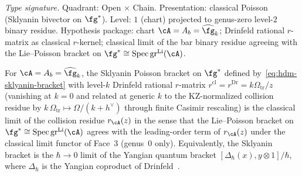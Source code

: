 \begin{theorem}
\label{thm:hdm-face-6}
\emph{Type signature.} Quadrant: Open $\times$ Chain. Presentation:
classical Poisson (Sklyanin bivector on $\fg^*$). Level: $1$ (chart)
projected to genus-zero level-$2$ binary residue.
Hypothesis package: chart $\cA = A_b = \widehat{\fg}_k$; Drinfeld
rational $r$-matrix as classical $r$-kernel; classical limit of
the bar binary residue agreeing with the Lie--Poisson bracket
on $\fg^*\cong\mathrm{Spec}\,\mathrm{gr}^{\mathrm{Li}}(\cA)$.

For $\cA = A_b = \widehat{\fg}_k$, the Sklyanin Poisson bracket on
$\fg^*$ defined by~\eqref{eq:hdm-sklyanin-bracket} with
level-$k$ Drinfeld rational $r$-matrix
$r^{\mathrm{cl}} = r^{\mathrm{Dr}} = k\Omega_{\mathrm{tr}}/z$
\textup{(}vanishing at $k=0$ and related at generic $k$ to the
KZ-normalized collision residue by
$k\,\Omega_{\mathrm{tr}}\mapsto
\Omega/(k+h^\vee)$ through finite Casimir rescaling\textup{)} is the classical
limit of the collision residue $r_\cA(z)$ in the sense that the
Lie--Poisson bracket on $\fg^* \cong \mathrm{Spec}\,\mathrm{gr}^{\mathrm{Li}}(\cA)$
agrees with the leading-order term of $r_\cA(z)$ under the classical
limit functor of Face~3 (genus~$0$ only). Equivalently, the Sklyanin bracket is the
$\hbar \to 0$ limit of the Yangian quantum bracket
$[\Delta_\hbar(x), y \otimes 1]/\hbar$, where $\Delta_\hbar$ is the
Yangian coproduct of Drinfeld~\cite{Drinfeld85}.
\end{theorem}

